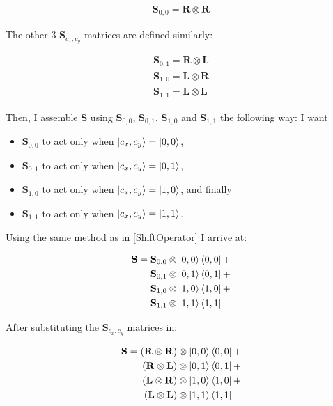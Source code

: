 \begin{align*}
    \mathbf{S}_{0,0} =  \mathbf{R} \otimes \mathbf{R}
\end{align*}

The other $3$ $\mathbf{S}_{c_x,c_y}$ matrices are defined similarly: 

\begin{align*}
    \mathbf{S}_{0,1} =  \mathbf{R} \otimes \mathbf{L}\\
    \mathbf{S}_{1,0} =  \mathbf{L} \otimes \mathbf{R}\\
    \mathbf{S}_{1,1} =  \mathbf{L} \otimes \mathbf{L}
\end{align*}

Then, I assemble $\mathbf{S}$ using $\mathbf{S}_{0,0}$, $\mathbf{S}_{0,1}$, $\mathbf{S}_{1,0}$ and $\mathbf{S}_{1,1}$ the following way: I want
\begin{itemize}
\item $\mathbf{S}_{0,0}$ to act only when $\ket{c_x,c_y} = \ket{0,0}$,
\item $\mathbf{S}_{0,1}$ to act only when $\ket{c_x,c_y} = \ket{0,1}$,
\item $\mathbf{S}_{1,0}$ to act only when $\ket{c_x,c_y} = \ket{1,0}$, and finally
\item $\mathbf{S}_{1,1}$ to act only when $\ket{c_x,c_y} = \ket{1,1}$.
\end{itemize}

Using the same method as in \ref{ShiftOperator} I arrive at:

\begin{align*}
    \mathbf{S} =
    \mathbf{S}_{0,0} \otimes \ket{0,0}\bra{0,0} + \\
    \mathbf{S}_{0,1} \otimes \ket{0,1}\bra{0,1} + \\
    \mathbf{S}_{1,0} \otimes \ket{1,0}\bra{1,0} + \\
    \mathbf{S}_{1,1} \otimes \ket{1,1}\bra{1,1}\phantom{+}
\end{align*}

After substituting the $\mathbf{S}_{c_x,c_y}$ matrices in:

\begin{align*} 
    \mathbf{S} =   
    (\mathbf{R} \otimes \mathbf{R}) \otimes \ket{0,0}\bra{0,0} + \\
    (\mathbf{R} \otimes \mathbf{L}) \otimes \ket{0,1}\bra{0,1} + \\
    (\mathbf{L} \otimes \mathbf{R}) \otimes \ket{1,0}\bra{1,0} + \\
    (\mathbf{L} \otimes \mathbf{L}) \otimes \ket{1,1}\bra{1,1}\phantom{+}
\end{align*}

